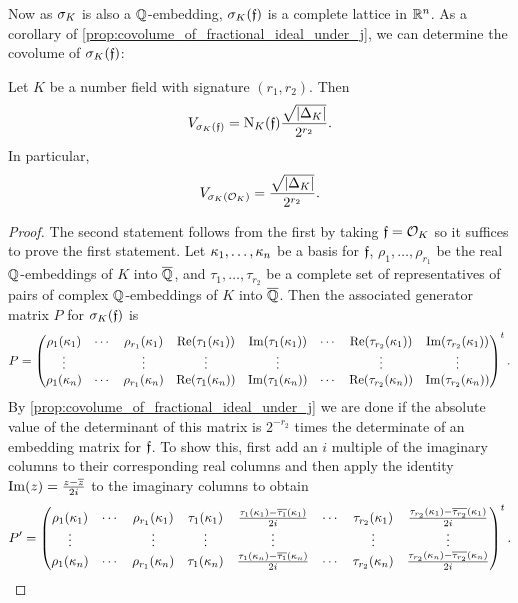     Now as $\sigma_{K}$ is also a $\mathbb{Q}$-embedding, $\sigma_{K}(\mathfrak{f})$ is a complete lattice in $\mathbb{R}^{n}$. As a corollary of \cref{prop:covolume_of_fractional_ideal_under_j}, we can determine the covolume of $\sigma_{K}(\mathfrak{f})$:
    
    \begin{corollary}\label{cor:covolume_of_fractional_ideal_under_canonical_embedding}
      Let $K$ be a number field with signature $(r_{1},r_{2})$. Then
      \[
        V_{\sigma_{K}(\mathfrak{f})} = \operatorname{\mathrm{N}}_{K}(\mathfrak{f})\frac{\sqrt{|\Delta_{K}|}}{2^{r_{2}}}.
      \]
      In particular,
      \[
        V_{\sigma_{K}(\mathcal{O}_{K})} = \frac{\sqrt{|\Delta_{K}|}}{2^{r_{2}}}.
      \]
    \end{corollary}
    \begin{proof}
      The second statement follows from the first by taking $\mathfrak{f} = \mathcal{O}_{K}$ so it suffices to prove the first statement. Let $\kappa_{1},\ldots,\kappa_{n}$ be a basis for $\mathfrak{f}$, $\rho_{1},\ldots,\rho_{r_{1}}$ be the real $\mathbb{Q}$-embeddings of $K$ into $\overline{\mathbb{Q}}$, and $\tau_{1},\ldots,\tau_{r_{2}}$ be a complete set of representatives of pairs of complex $\mathbb{Q}$-embeddings of $K$ into $\overline{\mathbb{Q}}$. Then the associated generator matrix $P$ for $\sigma_{K}(\mathfrak{f})$ is
      \[
        P = \begin{pmatrix} \rho_{1}(\kappa_{1}) & \cdots & \rho_{r_{1}}(\kappa_{1}) & \mathrm{Re}(\tau_{1}(\kappa_{1})) & \mathrm{Im}(\tau_{1}(\kappa_{1})) & \cdots & \mathrm{Re}(\tau_{r_{2}}(\kappa_{1})) & \mathrm{Im}(\tau_{r_{2}}(\kappa_{1})) \\ \vdots & & \vdots & \vdots & \vdots & & \vdots & \vdots \\ \rho_{1}(\kappa_{n}) & \cdots & \rho_{r_{1}}(\kappa_{n}) & \mathrm{Re}(\tau_{1}(\kappa_{n})) & \mathrm{Im}(\tau_{1}(\kappa_{n})) & \cdots & \mathrm{Re}(\tau_{r_{2}}(\kappa_{n})) & \mathrm{Im}(\tau_{r_{2}}(\kappa_{n})) \end{pmatrix}^{t}.
      \]
      By \cref{prop:covolume_of_fractional_ideal_under_j} we are done if the absolute value of the determinant of this matrix is $2^{-r_{2}}$ times the determinate of an embedding matrix for $\mathfrak{f}$. To show this, first add an $i$ multiple of the imaginary columns to their corresponding real columns and then apply the identity $\mathrm{Im}(z) = \frac{z-\overline{z}}{2i}$ to the imaginary columns to obtain
      \[
        P' = \begin{pmatrix} \rho_{1}(\kappa_{1}) & \cdots & \rho_{r_{1}}(\kappa_{1}) & \tau_{1}(\kappa_{1}) & \frac{\tau_{1}(\kappa_{1})-\overline{\tau_{1}}(\kappa_{1})}{2i} & \cdots & \tau_{r_{2}}(\kappa_{1}) & \frac{\tau_{r_{2}}(\kappa_{1})-\overline{\tau_{r_{2}}}(\kappa_{1})}{2i} \\ \vdots & & \vdots & \vdots & \vdots & & \vdots & \vdots \\ \rho_{1}(\kappa_{n}) & \cdots & \rho_{r_{1}}(\kappa_{n}) & \tau_{1}(\kappa_{n}) & \frac{\tau_{1}(\kappa_{n})-\overline{\tau_{1}}(\kappa_{n})}{2i} & \cdots & \tau_{r_{2}}(\kappa_{n}) & \frac{\tau_{r_{2}}(\kappa_{n})-\overline{\tau_{r_{2}}}(\kappa_{n})}{2i} \end{pmatrix}^{t}.
\]
\end{proof}
